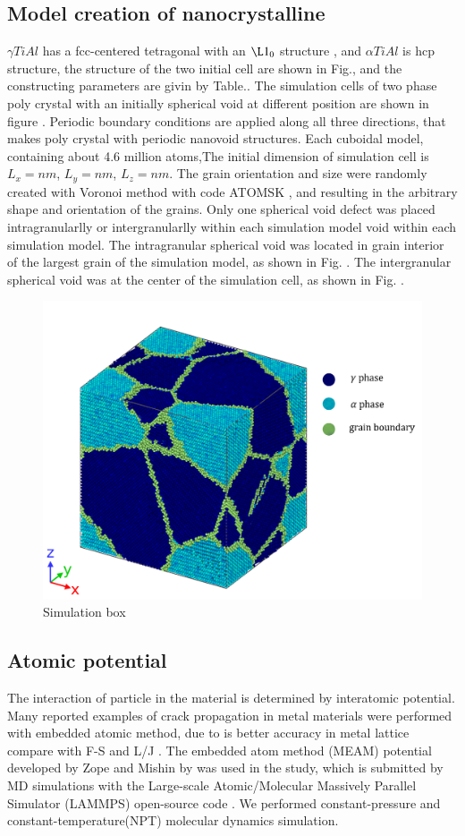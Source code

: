 \documentclass[review]{elsarticle}
\begin{document}
\subsection{Model creation of nanocrystalline}
$\gamma  TiAl$ has a fcc-centered tetragonal with an $\L1_0$ structure \cite{}, and $\alpha TiAl$ is hcp structure, the structure of the two initial cell are shown in Fig.\cite{}, and the constructing parameters are givin by Table.\cite{}. The simulation cells of two phase poly crystal with an initially spherical void at different position are shown in figure \cite{}. Periodic boundary conditions are applied along all three directions, that makes poly crystal with periodic nanovoid structures. Each cuboidal model, containing about 4.6 million atoms,The initial dimension of simulation cell is  $L_x = nm$, $L_y =  nm$, $L_z =  nm$. The grain orientation and size were randomly created with Voronoi method with code ATOMSK \cite{}, and resulting in the arbitrary shape and orientation of the grains. Only one spherical void defect was placed intragranularlly or intergranularlly within each simulation model void within each simulation model. The intragranular spherical void was located in grain interior of the largest grain of the simulation model, as shown in Fig. \cite{}. The intergranular spherical void was at the center of the simulation cell, as shown in Fig. \cite{}.
\begin{figure}
	\centering
	\includegraphics[width=0.7\linewidth]{img/pf_model_labeled}
	\caption{Simulation box}

\end{figure}

\subsection{Atomic potential}
The interaction of particle in the material is determined by interatomic potential. Many reported examples of crack propagation in metal materials were performed with embedded atomic method, due to is better accuracy in metal lattice compare with F-S and L/J \cite{compare LJ and other}. The embedded atom method (MEAM) potential developed by Zope and Mishin by \cite{} was used in the study, which is submitted by MD simulations with the Large-scale Atomic/Molecular Massively Parallel Simulator (LAMMPS) open-source code \cite{}. We performed constant-pressure and constant-temperature(NPT) molecular dynamics simulation.
\end{document}
